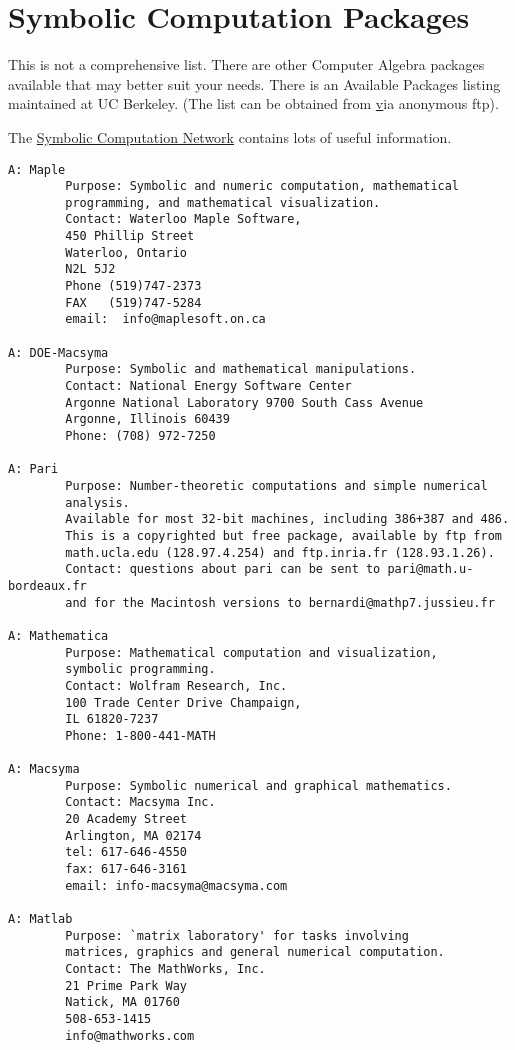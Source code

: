\section{Symbolic Computation Packages}

This is not a comprehensive list. There are other Computer Algebra
packages available that may better suit your needs. There is an
Available Packages listing maintained at UC Berkeley.  (The list can be
obtained from \href{ftp://math.berkeley.edu/} via anonymous ftp).

The \href{http://symbolicnet.mcs.kent.edu/}{Symbolic Computation
  Network} contains lots of useful information.

\begin{verbatim}
A: Maple
        Purpose: Symbolic and numeric computation, mathematical
        programming, and mathematical visualization.
        Contact: Waterloo Maple Software,
        450 Phillip Street
        Waterloo, Ontario
        N2L 5J2
        Phone (519)747-2373
        FAX   (519)747-5284
        email:  info@maplesoft.on.ca

A: DOE-Macsyma
        Purpose: Symbolic and mathematical manipulations.
        Contact: National Energy Software Center
        Argonne National Laboratory 9700 South Cass Avenue
        Argonne, Illinois 60439
        Phone: (708) 972-7250

A: Pari
        Purpose: Number-theoretic computations and simple numerical
        analysis.
        Available for most 32-bit machines, including 386+387 and 486.
        This is a copyrighted but free package, available by ftp from
        math.ucla.edu (128.97.4.254) and ftp.inria.fr (128.93.1.26).
        Contact: questions about pari can be sent to pari@math.u-bordeaux.fr
        and for the Macintosh versions to bernardi@mathp7.jussieu.fr

A: Mathematica
        Purpose: Mathematical computation and visualization,
        symbolic programming.
        Contact: Wolfram Research, Inc.
        100 Trade Center Drive Champaign,
        IL 61820-7237
        Phone: 1-800-441-MATH

A: Macsyma
        Purpose: Symbolic numerical and graphical mathematics.
        Contact: Macsyma Inc.
        20 Academy Street
        Arlington, MA 02174
        tel: 617-646-4550
        fax: 617-646-3161
        email: info-macsyma@macsyma.com

A: Matlab
        Purpose: `matrix laboratory' for tasks involving
        matrices, graphics and general numerical computation.
        Contact: The MathWorks, Inc.
        21 Prime Park Way
        Natick, MA 01760
        508-653-1415
        info@mathworks.com


\end{verbatim}

